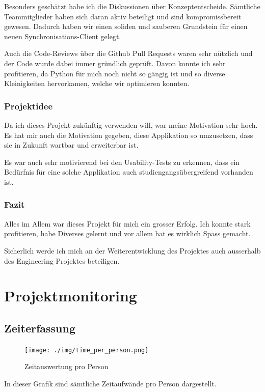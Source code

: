 \documentclass[a4paper]{article}
\let\oldsection\section
\renewcommand\section{\clearpage\oldsection}
\begin{document}
Besonders geschätzt habe ich die Diskussionen über Konzeptentscheide.
Sämtliche Teammitglieder haben sich daran aktiv beteiligt und sind kompromissbereit gewesen.
Dadurch haben wir einen soliden und sauberen Grundstein für einen neuen Synchronisations-Client gelegt.

Auch die Code-Reviews über die Github Pull Requests waren sehr nützlich und der Code wurde dabei immer gründlich geprüft.
Davon konnte ich sehr profitieren, da Python für mich noch nicht so gängig ist und so diverse Kleinigkeiten hervorkamen, welche wir optimieren konnten.

\subsubsection{Projektidee}

Da ich dieses Projekt zukünftig verwenden will, war meine Motivation sehr hoch.
Es hat mir auch die Motivation gegeben, diese Applikation so umzusetzen, dass sie in Zukunft wartbar und erweiterbar ist.

Es war auch sehr motivierend bei den Usability-Tests zu erkennen, dass ein Bedürfnis für eine solche Applikation auch studiengangsübergreifend vorhanden ist.

\subsubsection{Fazit}

Alles im Allem war dieses Projekt für mich ein grosser Erfolg.
Ich konnte stark profitieren, habe Diverses gelernt und vor allem hat es wirklich Spass gemacht.

Sicherlich werde ich mich an der Weiterentwicklung des Projektes auch ausserhalb des Engineering Projektes beteiligen.

\section{Projektmonitoring}

\subsection{Zeiterfassung}

\begin{figure}[H]
  \texttt{[image: ./img/time\_per\_person.png]}
  \caption{Zeitauswertung pro Person}
\end{figure}

In dieser Grafik sind sämtliche Zeitaufwände pro Person dargestellt.
\end{document}
